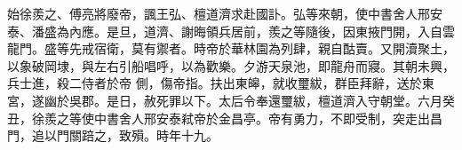 \begin{pinyinscope}
 始徐羨之、傅亮將廢帝，諷王弘、檀道濟求赴國訃。弘等來朝，使中書舍人邢安泰、潘盛為內應。是旦，道濟、謝晦領兵居前，羨之等隨後，因東掖門開，入自雲龍門。盛等先戒宿衛，莫有禦者。時帝於華林園為列肆，親自酤賣。又開瀆聚土，以象破岡埭，與左右引船唱呼，以為歡樂。夕游天泉池，即龍舟而寢。其朝未興，兵士進，殺二侍者於帝
 側，傷帝指。扶出東皞，就收璽紱，群臣拜辭，送於東宮，遂幽於吳郡。是日，赦死罪以下。太后令奉還璽紱，檀道濟入守朝堂。六月癸丑，徐羨之等使中書舍人邢安泰弒帝於金昌亭。帝有勇力，不即受制，突走出昌門，追以門關踣之，致殞。時年十九。



\end{pinyinscope}